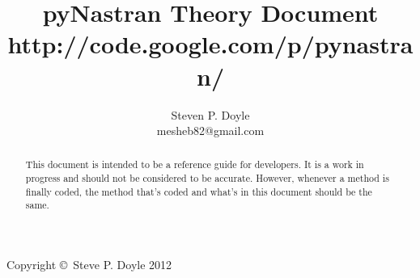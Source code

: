 \documentclass[a4paper,12pt]{article}
\begin{document}
\title{pyNastran Theory Document \\
\small http://code.google.com/p/pynastran/ }
\author{Steven P. Doyle\\
{\small mesheb82@gmail.com}
}

\maketitle

\begin{abstract}
This document is intended to be a reference guide for developers.  It is a work in progress and should not be considered to be accurate.  However, whenever a method is finally coded, the method that's coded and what's in this document should be the same.
\end{abstract}

Copyright \copyright\ Steve P. Doyle 2012
\newpage

\tableofcontents
\newpage


\newpage








%
%
\end{document}
